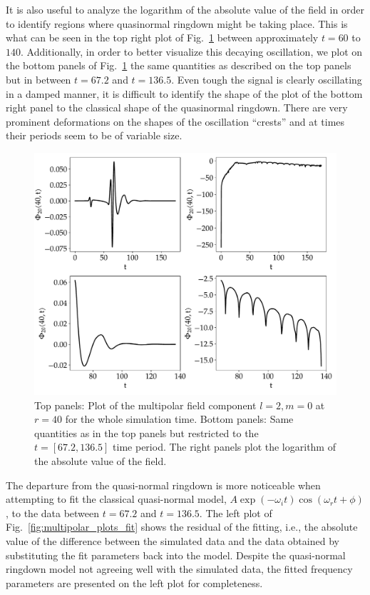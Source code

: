 It is also useful to analyze the logarithm of the absolute value of the field in order to identify regions where quasinormal ringdown might be taking place. This is what can be seen in the top right plot of Fig.~\ref{fig:multipolar_plots} between approximately $t=60$ to $140$. Additionally, in order to better visualize this decaying oscillation, we plot on the bottom panels of Fig.~\ref{fig:multipolar_plots} the same quantities as described on the top panels but in between $t=67.2$ and $t=136.5$. Even tough the signal is clearly oscillating in a damped manner, it is difficult to identify the shape of the plot of the bottom right panel to the classical shape of the quasinormal ringdown. There are very prominent deformations on the shapes of the oscillation ``crests'' and at times their periods seem to be of variable size.

\begin{figure}[h]
  \centering
  \includegraphics[width=\linewidth]{img/wave_scattering/multipolar_plots}
  \caption{Top panels: Plot of the multipolar field component $l=2,m=0$ at $r=40$ for the whole simulation time. Bottom panels: Same quantities as in the top panels but restricted to the $t=[67.2, 136.5]$ time period. The right panels plot the logarithm of the absolute value of the field.}
  \label{fig:multipolar_plots}
\end{figure}

The departure from the quasi-normal ringdown is more noticeable when attempting to fit the classical quasi-normal model, $A \exp(-\omega_i t) \cos(\omega_r t + \phi)$, to the data between $t=67.2$ and $t=136.5$. The left plot of Fig.~\ref{fig:multipolar_plots_fit} shows the residual of the fitting, i.e., the absolute value of the difference between the simulated data and the data obtained by substituting the fit parameters back into the model. Despite the quasi-normal ringdown model not agreeing well with the simulated data, the fitted frequency parameters are presented on the left plot for completeness.

